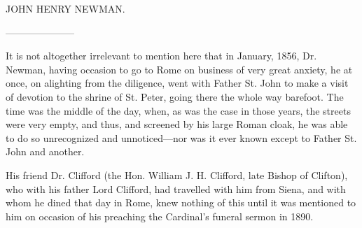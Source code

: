JOHN HENRY
NEWMAN.

———————

It is not altogether irrelevant to mention here
that in January, 1856, Dr. Newman, having occasion to go to Rome on
business of very great anxiety, he at once, on alighting from the
diligence, went with Father St. John to make a visit of devotion to
the shrine of St. Peter, going there the whole way barefoot. The time
was the middle of the day, when, as was the case in those years, the
streets were very empty, and thus, and screened by his large Roman
cloak, he was able to do so unrecognized and unnoticed—nor was it
ever known except to Father St. John and another.

His friend Dr. Clifford (the Hon. William J. H.
Clifford, late Bishop of Clifton), who with his father Lord Clifford,
had travelled with him from Siena, and with whom he dined that day in
Rome, knew nothing of this until it was mentioned to him on occasion
of his preaching the Cardinal's funeral sermon in 1890.
